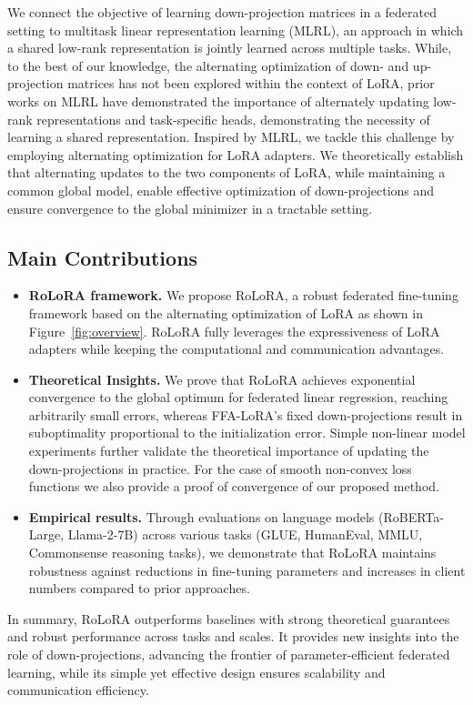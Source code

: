 \documentclass{article}
\theoremstyle{plain}
\theoremstyle{definition}
\theoremstyle{remark}
\begin{document}
We connect the objective of learning down-projection matrices in a federated setting to multitask linear representation learning (MLRL), an approach in which a shared low-rank representation is jointly learned across multiple tasks. While, to the best of our knowledge, the alternating optimization of down- and up-projection matrices has not been explored within the context of LoRA, prior works on MLRL \cite{pmlr-v139-collins21a, thekumparampil2021sampleefficientlinearmetalearning} have demonstrated the importance of alternately updating low-rank representations and task-specific heads, demonstrating the necessity of learning a shared representation. Inspired by MLRL, we tackle this challenge by employing alternating optimization for LoRA adapters. We theoretically establish that alternating updates to the two components of LoRA, while maintaining a common global model, enable effective optimization of down-projections and ensure convergence to the global minimizer in a tractable setting.
\vspace{-0.3cm}
\subsection{Main Contributions}
\begin{itemize}[noitemsep]
    \item \textbf{RoLoRA framework.} We propose RoLoRA, a robust federated fine-tuning framework based on the alternating optimization of LoRA as shown in Figure~\ref{fig:overview}. RoLoRA fully leverages the expressiveness of LoRA adapters while keeping the computational and communication advantages. 
    \item \textbf{Theoretical Insights.} We prove that RoLoRA achieves exponential convergence to the global optimum for federated linear regression, reaching arbitrarily small errors, whereas FFA-LoRA’s fixed down-projections result in suboptimality proportional to the initialization error. Simple non-linear model experiments further validate the theoretical importance of updating the down-projections in practice. For the case of smooth non-convex loss functions we also provide a proof of convergence of our proposed method.
    \item \textbf{Empirical results.} Through evaluations on language models (RoBERTa-Large, Llama-2-7B) across various tasks (GLUE, HumanEval, MMLU, Commonsense reasoning tasks), we demonstrate that RoLoRA maintains robustness against reductions in fine-tuning parameters and increases in client numbers compared to prior approaches.
\end{itemize}
\vspace{-0.3cm}
{
In summary, RoLoRA outperforms baselines with strong theoretical guarantees and robust performance across tasks and scales. It provides new insights into the role of down-projections, advancing the frontier of parameter-efficient federated learning, while its simple yet effective design ensures scalability and communication efficiency.}
\end{document}
